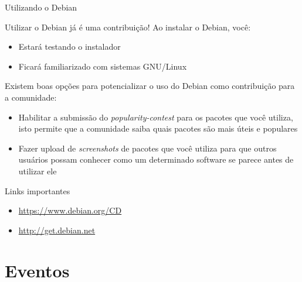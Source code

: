 \documentclass[10pt, compress, aspectratio=169]{beamer}
\begin{document}
\begin{frame}{Utilizando o Debian}

  \begin{exampleblock}{Utilizar o Debian já é uma contribuição! Ao instalar o Debian, você:}
      \begin{itemize}
        \item Estará testando o instalador
        \item Ficará familiarizado com sistemas GNU/Linux
      \end{itemize}
  \end{exampleblock}

  Existem boas opções para potencializar o uso do Debian como contribuição
  para a comunidade:

  \begin{itemize}
    \item Habilitar a submissão do \textit{popularity-contest} para os pacotes
          que você utiliza, isto permite que a comunidade saiba quais pacotes
          são mais úteis e populares
    \item Fazer upload de \textit{screenshots} de pacotes que você utiliza para
          que outros usuários possam conhecer como um determinado software se
          parece antes de utilizar ele
  \end{itemize}

  \begin{exampleblock}{Links importantes}
    \begin{itemize}
      \item \url{https://www.debian.org/CD}
      \item \url{http://get.debian.net}
    \end{itemize}
  \end{exampleblock}

\end{frame}

\section{Eventos}
\end{document}
